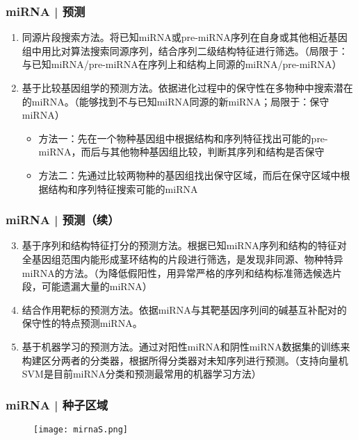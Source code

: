 \begin{frame}
  \frametitle{miRNA | \alert{预测}}
  \begin{enumerate}
    \item 同源片段搜索方法。将已知miRNA或pre-miRNA序列在自身或其他相近基因组中用比对算法搜索同源序列，结合序列二级结构特征进行筛选。（局限于：与已知miRNA/pre-miRNA在序列上和结构上同源的miRNA/pre-miRNA）
    \item 基于比较基因组学的预测方法。依据进化过程中的保守性在多物种中搜索潜在的miRNA。（能够找到不与已知miRNA同源的新miRNA；局限于：保守miRNA）
      \begin{itemize}
	\item 方法一：先在一个物种基因组中根据结构和序列特征找出可能的pre-miRNA，而后与其他物种基因组比较，判断其序列和结构是否保守
	\item 方法二：先通过比较两物种的基因组找出保守区域，而后在保守区域中根据结构和序列特征搜索可能的miRNA
      \end{itemize}
  \end{enumerate}
\end{frame}

\begin{frame}
  \frametitle{miRNA | \alert{预测}（续）}
  \begin{enumerate}
    \setcounter{enumi}{2}
    \item 基于序列和结构特征打分的预测方法。根据已知miRNA序列和结构的特征对全基因组范围内能形成茎环结构的片段进行筛选，是发现非同源、物种特异miRNA的方法。（为降低假阳性，用异常严格的序列和结构标准筛选候选片段，可能遗漏大量的miRNA）
    \item 结合作用靶标的预测方法。依据miRNA与其靶基因序列间的碱基互补配对的保守性的特点预测miRNA。
    \item 基于机器学习的预测方法。通过对阳性miRNA和阴性miRNA数据集的训练来构建区分两者的分类器，根据所得分类器对未知序列进行预测。（支持向量机SVM是目前miRNA分类和预测最常用的机器学习方法）
  \end{enumerate}
\end{frame}

\begin{frame}
  \frametitle{miRNA | 种子区域}
  \begin{figure}
    \centering
    \texttt{[image: mirnaS.png]}
  \end{figure}
\end{frame}

